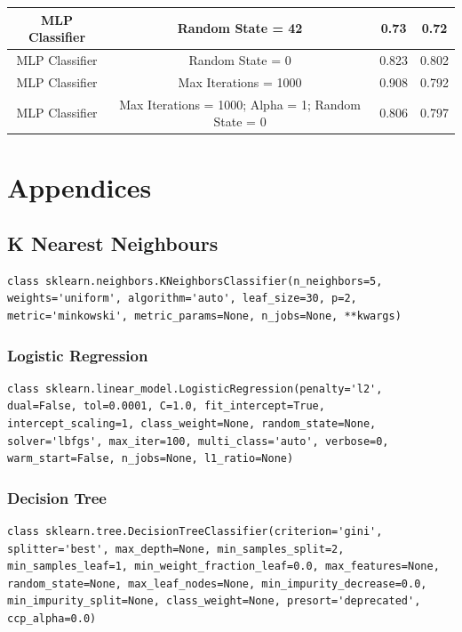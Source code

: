 \documentclass[12pt]{article}
\begin{document}
{\begin{landscape}
\begin{table}[]
\begin{tabular}{|c|c|c|c|}
MLP Classifier         & Random State = 42                                  & 0.73               & 0.72              \\ \hline
MLP Classifier         & Random State = 0                                   & 0.823              & 0.802             \\ \hline
MLP Classifier         & Max Iterations = 1000                              & 0.908              & 0.792             \\ \hline
MLP Classifier         & Max Iterations = 1000; Alpha = 1; Random State = 0 & 0.806              & 0.797             \\ \hline
\end{tabular}
\end{table}
\label{table:2}
\end{landscape}
\clearpage
}

\newpage
\section{Appendices}
\subsection{K Nearest Neighbours}
\begin{lstlisting}
class sklearn.neighbors.KNeighborsClassifier(n_neighbors=5, weights='uniform', algorithm='auto', leaf_size=30, p=2, metric='minkowski', metric_params=None, n_jobs=None, **kwargs)
\end{lstlisting}

\subsubsection{Logistic Regression}
\begin{lstlisting}
class sklearn.linear_model.LogisticRegression(penalty='l2', dual=False, tol=0.0001, C=1.0, fit_intercept=True, intercept_scaling=1, class_weight=None, random_state=None, solver='lbfgs', max_iter=100, multi_class='auto', verbose=0, warm_start=False, n_jobs=None, l1_ratio=None)
\end{lstlisting}

\subsubsection{Decision Tree}
\begin{lstlisting}
class sklearn.tree.DecisionTreeClassifier(criterion='gini', splitter='best', max_depth=None, min_samples_split=2, min_samples_leaf=1, min_weight_fraction_leaf=0.0, max_features=None, random_state=None, max_leaf_nodes=None, min_impurity_decrease=0.0, min_impurity_split=None, class_weight=None, presort='deprecated', ccp_alpha=0.0)
\end{lstlisting}
\end{document}
